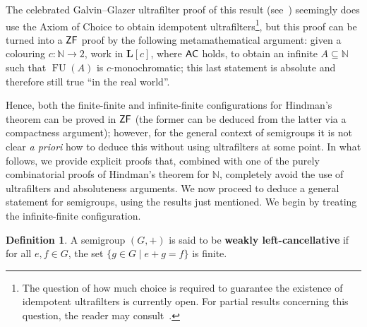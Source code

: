 \documentclass{amsart}
\theoremstyle{definition}
\newtheorem{definition}[theorem]{Definition}
\newcommand{\zf}{\mathnormal{\mathsf{ZF}}}
\newcommand{\ac}{\mathnormal{\mathsf{AC}}}
\theoremstyle{remark}
\newtheorem{remark}[theorem]{Remark}
\numberwithin{equation}{section}
\begin{document}
The celebrated Galvin--Glazer ultrafilter proof of this result (see~\cite{HindmanStrauss2012}) seemingly does use the Axiom of Choice to obtain idempotent ultrafilters\footnote{The question of how much choice is required to guarantee the existence of idempotent ultrafilters is currently open. For partial results concerning this question, the reader may consult~\cite{Tachtsis2018,DiNassoTachtsis2018,FernandezNavarroSoria2025}.}, but this proof can be turned into a $\zf$ proof by the following metamathematical argument: given a colouring $c:\mathbb N\longrightarrow 2$, work in $\mathbf{L}[c]$, where $\ac$ holds, to obtain an infinite $A\subseteq\mathbb N$ such that $\operatorname{FU}(A)$ is $c$-monochromatic; this last statement is absolute and therefore still true ``in the real world''.

Hence, both the finite-finite and infinite-finite configurations for Hindman's theorem can be proved in $\zf$ (the former can be deduced from the latter via a compactness argument); however, for the general context of semigroups it is not clear {\it a priori} how to deduce this without using ultrafilters at some point. In what follows, we provide explicit proofs that, combined with one of the purely combinatorial proofs of Hindman's theorem for $\mathbb N$, completely avoid the use of ultrafilters and absoluteness arguments. We now proceed to deduce a general statement for semigroups, using the results just mentioned. We begin by treating the infinite-finite configuration.




\begin{definition}
    A semigroup $(G, +)$ is said to be \textbf{weakly left-cancellative} if for all $e, f\in G$, the set $\{g\in G\mid e+g=f\}$ is finite.
\end{definition}
\end{document}
